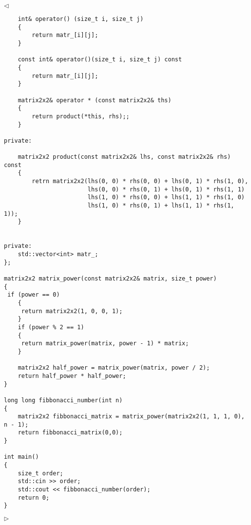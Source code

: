 \documentclass[12pt]{article}
\newenvironment{solution}{\par $\triangleleft$}{$\triangleright$}
\begin{document}
\begin{solution}
\begin{verbatim}
    int& operator() (size_t i, size_t j)
    {
        return matr_[i][j];
    }
    
    const int& operator()(size_t i, size_t j) const
    {
        return matr_[i][j];
    }
    
    matrix2x2& operator * (const matrix2x2& ths)
    {
        return product(*this, rhs);;
    }
    
private:
 
    matrix2x2 product(const matrix2x2& lhs, const matrix2x2& rhs) const
    {
        retrn matrix2x2(lhs(0, 0) * rhs(0, 0) + lhs(0, 1) * rhs(1, 0),
                        lhs(0, 0) * rhs(0, 1) + lhs(0, 1) * rhs(1, 1)
                        lhs(1, 0) * rhs(0, 0) + lhs(1, 1) * rhs(1, 0)
                        lhs(1, 0) * rhs(0, 1) + lhs(1, 1) * rhs(1, 1));
    }
    
   
private:
    std::vector<int> matr_;
};
 
matrix2x2 matrix_power(const matrix2x2& matrix, size_t power)
{
 if (power == 0)
    {
     return matrix2x2(1, 0, 0, 1);
    }
    if (power % 2 == 1)
    {
     return matrix_power(matrix, power - 1) * matrix;
    }
    
    matrix2x2 half_power = matrix_power(matrix, power / 2);
    return half_power * half_power;
}
 
long long fibbonacci_number(int n)
{
    matrix2x2 fibbonacci_matrix = matrix_power(matrix2x2(1, 1, 1, 0), n - 1);
    return fibbonacci_matrix(0,0);
}
 
int main()
{
    size_t order;
    std::cin >> order;
    std::cout << fibbonacci_number(order);
    return 0;
}
\end{verbatim}
\end{solution}
 
\end{document}
